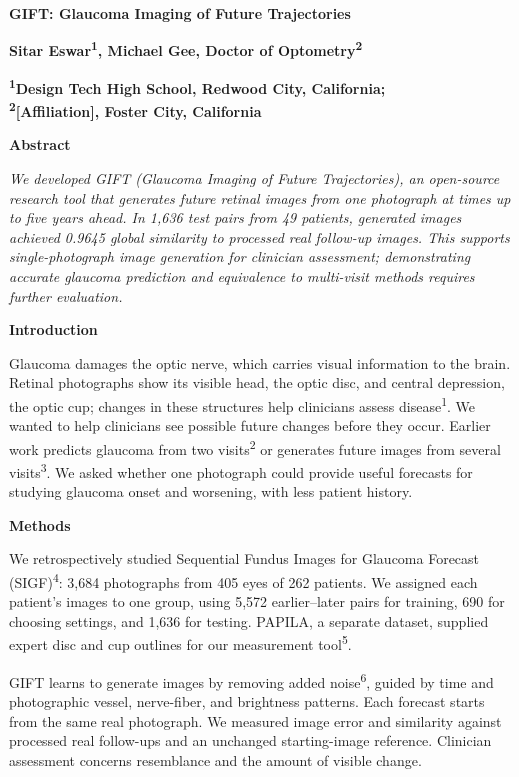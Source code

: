 \documentclass[10pt,letterpaper]{article}
\newcommand{\subhead}[1]{\par\vspace{3pt}\noindent\textbf{#1}\par\nobreak}
\newcommand{\fillin}[1]{\textcolor{forecastorange}{\textbf{[#1]}}}
\begin{document}
\begin{center}
{\fontsize{14}{16}\selectfont\bfseries GIFT: Glaucoma Imaging of Future Trajectories}\par
{\fontsize{12}{14}\selectfont\bfseries Sitar Eswar\textsuperscript{1}, Michael Gee, Doctor of Optometry\textsuperscript{2}}\par
{\fontsize{12}{14}\selectfont\bfseries \textsuperscript{1}Design Tech High School, Redwood City, California;\\
\textsuperscript{2}\fillin{Affiliation}, Foster City, California}
\end{center}
\vspace{-5pt}
\subhead{Abstract}
\emph{We developed GIFT (Glaucoma Imaging of Future Trajectories), an open-source research tool that generates future retinal images from one photograph at times up to five years ahead. In 1,636 test pairs from 49 patients, generated images achieved 0.9645 global similarity to processed real follow-up images. This supports single-photograph image generation for clinician assessment; demonstrating accurate glaucoma prediction and equivalence to multi-visit methods requires further evaluation.}

\subhead{Introduction}
Glaucoma damages the optic nerve, which carries visual information to the brain. Retinal photographs show its visible head, the optic disc, and central depression, the optic cup; changes in these structures help clinicians assess disease\textsuperscript{1}. We wanted to help clinicians see possible future changes before they occur. Earlier work predicts glaucoma from two visits\textsuperscript{2} or generates future images from several visits\textsuperscript{3}. We asked whether one photograph could provide useful forecasts for studying glaucoma onset and worsening, with less patient history.

\subhead{Methods}
We retrospectively studied Sequential Fundus Images for Glaucoma Forecast (SIGF)\textsuperscript{4}: 3,684 photographs from 405 eyes of 262 patients. We assigned each patient's images to one group, using 5,572 earlier--later pairs for training, 690 for choosing settings, and 1,636 for testing. PAPILA, a separate dataset, supplied expert disc and cup outlines for our measurement tool\textsuperscript{5}.

GIFT learns to generate images by removing added noise\textsuperscript{6}, guided by time and photographic vessel, nerve-fiber, and brightness patterns. Each forecast starts from the same real photograph. We measured image error and similarity against processed real follow-ups and an unchanged starting-image reference. Clinician assessment concerns resemblance and the amount of visible change.
\end{document}
